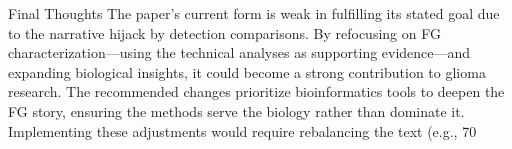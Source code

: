 Final Thoughts
The paper’s current form is weak in fulfilling its stated goal due to the narrative hijack by detection comparisons. By refocusing on FG characterization—using the technical analyses as supporting evidence—and expanding biological insights, it could become a strong contribution to glioma research. The recommended changes prioritize bioinformatics tools to deepen the FG story, ensuring the methods serve the biology rather than dominate it. Implementing these adjustments would require rebalancing the text (e.g., 70%

